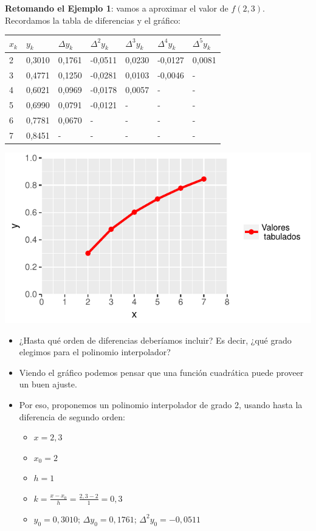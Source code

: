 \documentclass[]{book}
\providecommand{\tightlist}{%
  \setlength{\itemsep}{0pt}\setlength{\parskip}{0pt}}
\begin{document}
\textbf{Retomando el Ejemplo 1}: vamos a aproximar el valor de \(f(2,3)\). Recordamos la tabla de diferencias y el gráfico:

\begin{longtable}[]{@{}lllllll@{}}
\toprule
\(x_k\) & \(y_k\) & \(\Delta y_k\) & \(\Delta^2 y_k\) & \(\Delta^3 y_k\) & \(\Delta^4 y_k\) & \(\Delta^5 y_k\)\tabularnewline
\midrule
\endhead
2 & 0,3010 & 0,1761 & -0,0511 & 0,0230 & -0,0127 & 0,0081\tabularnewline
3 & 0,4771 & 0,1250 & -0,0281 & 0,0103 & -0,0046 & -\tabularnewline
4 & 0,6021 & 0,0969 & -0,0178 & 0,0057 & - & -\tabularnewline
5 & 0,6990 & 0,0791 & -0,0121 & - & - & -\tabularnewline
6 & 0,7781 & 0,0670 & - & - & - & -\tabularnewline
7 & 0,8451 & - & - & - & - & -\tabularnewline
\bottomrule
\end{longtable}

\begin{center}\includegraphics[width=1\linewidth]{Plots/U4/Unidad4_g1} \end{center}

\begin{itemize}
\item
  ¿Hasta qué orden de diferencias deberíamos incluir? Es decir, ¿qué grado elegimos para el polinomio interpolador?
\item
  Viendo el gráfico podemos pensar que una función cuadrática puede proveer un buen ajuste.
\item
  Por eso, proponemos un polinomio interpolador de grado 2, usando hasta la diferencia de segundo orden:

  \begin{itemize}
  \tightlist
  \item
    \(x = 2,3\)
  \item
    \(x_0 = 2\)
  \item
    \(h = 1\)
  \item
    \(k = \frac{x-x_0}{h} = \frac{2,3-2}{1} = 0,3\)
  \item
    \(y_0 = 0,3010\); \(\Delta y_0 = 0,1761\); \(\Delta^2 y_0 = -0,0511\)
  \end{itemize}
\end{itemize}
\end{document}
